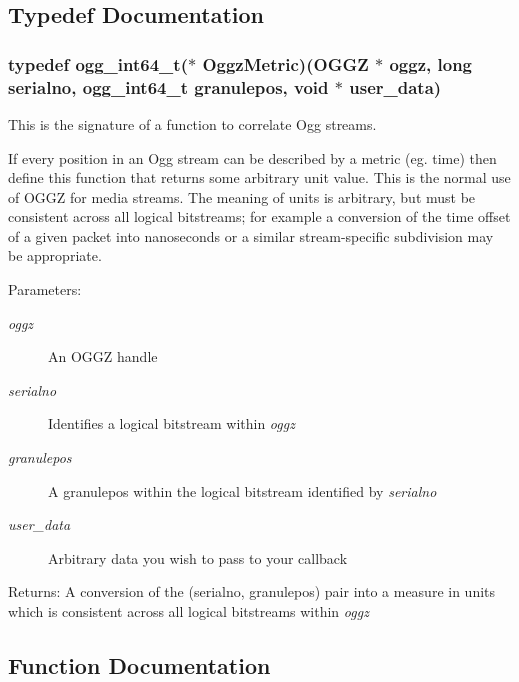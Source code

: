 \subsection{Typedef Documentation}
\subsubsection{\setlength{\rightskip}{0pt plus 5cm}typedef ogg\_\-int64\_\-t($\ast$ {\bf Oggz\-Metric})({\bf OGGZ} $\ast$ oggz, long serialno, ogg\_\-int64\_\-t granulepos, void $\ast$ user\_\-data)}\label{group__seek__api_a0}


This is the signature of a function to correlate Ogg streams. 

If every position in an Ogg stream can be described by a metric (eg. time) then define this function that returns some arbitrary unit value. This is the normal use of OGGZ for media streams. The meaning of units is arbitrary, but must be consistent across all logical bitstreams; for example a conversion of the time offset of a given packet into nanoseconds or a similar stream-specific subdivision may be appropriate.

\begin{Desc}
\item[Parameters:]
\begin{description}
\item[{\em oggz}]An OGGZ handle \item[{\em serialno}]Identifies a logical bitstream within {\em oggz\/} \item[{\em granulepos}]A granulepos within the logical bitstream identified by {\em serialno\/} \item[{\em user\_\-data}]Arbitrary data you wish to pass to your callback \end{description}
\end{Desc}
\begin{Desc}
\item[Returns:]A conversion of the (serialno, granulepos) pair into a measure in units which is consistent across all logical bitstreams within {\em oggz\/} \end{Desc}


\subsection{Function Documentation}
